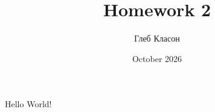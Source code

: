 \documentclass{article}
\title{Homework 2}
\author{Глеб Класон}
\date{October 2026}
\begin{document}
\maketitle

Hello World!
\end{document}
